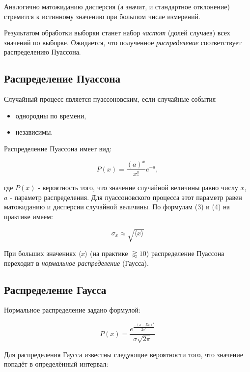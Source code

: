 \documentclass{report}
\begin{document}
	Аналогично матожиданию дисперсия (а значит, и стандартное отклонение) стремится к истинному значению при большом числе измерений.
	
	Результатом обработки выборки станет набор \textit{частот} (долей случаев) всех значений по выборке. Ожидается, что полученное \textit{распределение} соответствует распределению Пуассона.
	
	\subsection*{Распределение Пуассона}
	
	Случайный процесс является пуассоновским, если случайные события
	\begin{itemize}
		\item однородны по времени,
		\item независимы.
	\end{itemize}
	
	Распределение Пуассона имеет вид:
	
	\begin{equation}
		P(x) = \frac{(a)^{x}}{x!} e^{-a},
	\end{equation}
	
	где $P(x)$ - вероятность того, что значение случайной величины равно числу $x$, $a$ - параметр распределения. Для пуассоновского процесса этот параметр равен матожиданию и дисперсии случайной величины. По формулам (3) и (4) на практике имеем:
	
	\begin{equation}
		\sigma_{x} \approx \sqrt{\langle x \rangle}
	\end{equation}
	
	При больших значениях $\langle x \rangle$ (на практике $\gtrapprox 10$) распределение Пуассона переходит в \textit{нормальное распределение} (Гаусса).
	
	\subsection*{Распределение Гаусса}
	
	Нормальное распределение задано формулой:
	
	\begin{equation}
		P(x) = \frac{e^\frac{-(x-Ex)^{2}}{2\sigma^{2}}}{\sigma \sqrt{2\pi}}
	\end{equation}
	
	Для распределения Гаусса известны следующие вероятности того, что значение попадёт в определённый интервал:
	
\end{document}
